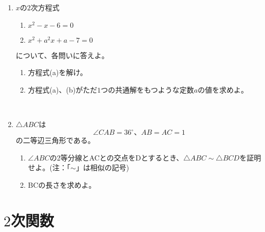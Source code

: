\documentclass[10pt,a4paper,fleqn]{jsarticle}
\begin{document}
\begin{enumerate}
\item $x$の$2$次方程式 
\begin{enumerate}
\item $x^2-x-6=0$
\item $x^2+a^2x+a-7=0$
\end{enumerate}
\begin{flushleft}
について、各問いに答えよ。
\end{flushleft}
\begin{enumerate}[(1)]
\item 方程式(a)を解け。
\item 方程式(a)、(b)がただ$1$つの共通解をもつような定数$a$の値を求めよ。
\end{enumerate}\

\item {$\bigtriangleup ABC$は\[ \angle CAB=36^\circ 、AB=AC=1 \] の二等辺三角形である。
\begin{enumerate}[(1)]
\item $\angle ABC$の2等分線とACとの交点をDとするとき、$\bigtriangleup ABC\sim\bigtriangleup BCD$を証明せよ。\newline (注：「$\sim$」は相似の記号)
\item BCの長さを求めよ。
\end{enumerate}
}
\end{enumerate}

\section{$2$次関数}
\end{document}
